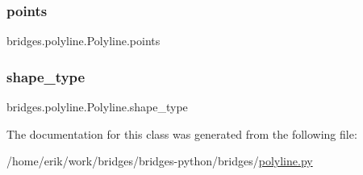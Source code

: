 \subsubsection{\texorpdfstring{points}{points}}
{\footnotesize\ttfamily bridges.\+polyline.\+Polyline.\+points}

\mbox{\label{classbridges_1_1polyline_1_1_polyline_a78459f0ed0614a7ab7c2d44de2f7439f}} 
\subsubsection{\texorpdfstring{shape\+\_\+type}{shape\_type}}
{\footnotesize\ttfamily bridges.\+polyline.\+Polyline.\+shape\+\_\+type}



The documentation for this class was generated from the following file\+:\begin{DoxyCompactItemize}
\item 
/home/erik/work/bridges/bridges-\/python/bridges/\hyperlink{polyline_8py}{polyline.\+py}\end{DoxyCompactItemize}
